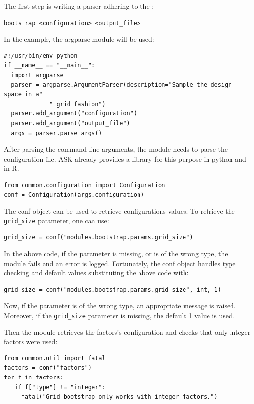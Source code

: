 The first step is writing a parser adhering to the :
\begin{verbatim}
bootstrap <configuration> <output_file>
\end{verbatim}

In the example, the argparse module will be used:

\begin{verbatim}
#!/usr/bin/env python
if __name__ == "__main__":
  import argparse
  parser = argparse.ArgumentParser(description="Sample the design space in a" 
             " grid fashion")
  parser.add_argument("configuration")
  parser.add_argument("output_file")
  args = parser.parse_args()
\end{verbatim}

After parsing the command line arguments, the module needs to parse the configuration file. ASK already provides a library for this purpose in python and in R.

\begin{verbatim}
from common.configuration import Configuration
conf = Configuration(args.configuration)
\end{verbatim}

The conf object can be used to retrieve configurations values. To retrieve the \texttt{grid\_size} parameter, one can use:
\begin{verbatim}
grid_size = conf("modules.bootstrap.params.grid_size")
\end{verbatim}

In the above code, if the parameter is missing, or is of the wrong type, the module fails and an error is logged. Fortunately, the conf object handles type checking and default values substituting the above code with:

\begin{verbatim}
grid_size = conf("modules.bootstrap.params.grid_size", int, 1)
\end{verbatim}

Now, if the parameter is of the wrong type, an appropriate message is raised. Moreover, if the \texttt{grid\_size} parameter is missing, the default 1 value is used. 

Then the module retrieves the factors's configuration and checks that only integer factors were used:

\begin{verbatim}
from common.util import fatal
factors = conf("factors")
for f in factors:
   if f["type"] != "integer":
     fatal("Grid bootstrap only works with integer factors.")
\end{verbatim}


